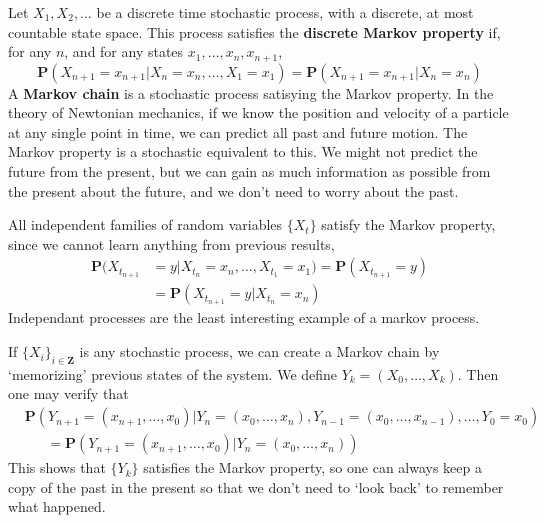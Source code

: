 Let $X_1, X_2, \dots$ be a discrete time stochastic process, with a discrete, at most countable state space. This process satisfies the {\bf discrete Markov property} if, for any $n$, and for any states $x_1, \dots, x_n, x_{n+1}$,
%
\[ \mathbf{P}(X_{n+1} = x_{n+1} | X_n = x_n, \dots, X_1 = x_1) = \mathbf{P}(X_{n+1} = x_{n+1} | X_n = x_n) \]
%
A {\bf Markov chain} is a stochastic process satisying the Markov property. In the theory of Newtonian mechanics, if we know the position and velocity of a particle at any single point in time, we can predict all past and future motion. The Markov property is a stochastic equivalent to this. We might not predict the future from the present, but we can gain as much information as possible from the present about the future, and we don't need to worry about the past.

\begin{example}
    All independent families of random variables $\{ X_t \}$ satisfy the Markov property, since we cannot learn anything from previous results,
    \begin{align*}
        \mathbf{P}(X_{t_{n+1}} &= y | X_{t_n} = x_n, \dots, X_{t_1} = x_1) = \mathbf{P}(X_{t_{n+1}} = y)\\
        &= \mathbf{P}(X_{t_{n+1}} = y | X_{t_n} = x_n)
    \end{align*}
    Independant processes are the least interesting example of a markov process.
\end{example}

\begin{example}
    If $\{X_i\}_{i \in \mathbf{Z}}$ is any stochastic process, we can create a Markov chain by `memorizing' previous states of the system. We define $Y_k = (X_0, \dots, X_k)$. Then one may verify that
    \begin{align*} &\mathbf{P}(Y_{n+1} = (x_{n+1}, \dots, x_0) | Y_n = (x_0, \dots, x_n), Y_{n-1} = (x_0, \dots, x_{n-1}), \dots, Y_0 = x_0)\\
    &\ \ \ \ \ \ \ = \mathbf{P}(Y_{n+1} = (x_{n+1}, \dots, x_0) | Y_n = (x_0, \dots, x_n)) \end{align*}
    This shows that $\{ Y_k \}$ satisfies the Markov property, so one can always keep a copy of the past in the present so that we don't need to `look back' to remember what happened.
\end{example}

